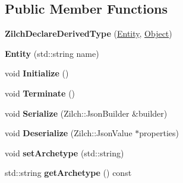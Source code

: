 \subsection*{Public Member Functions}
\begin{DoxyCompactItemize}
\item 
\hypertarget{classDCEngine_1_1Entity_a694fa17c410e8a544c387774c1ee439d}{{\bfseries Zilch\-Declare\-Derived\-Type} (\hyperlink{classDCEngine_1_1Entity}{Entity}, \hyperlink{classDCEngine_1_1Object}{Object})}\label{classDCEngine_1_1Entity_a694fa17c410e8a544c387774c1ee439d}

\item 
\hypertarget{classDCEngine_1_1Entity_a82afa978d172a7a1d3563697dc3688fe}{{\bfseries Entity} (std\-::string name)}\label{classDCEngine_1_1Entity_a82afa978d172a7a1d3563697dc3688fe}

\item 
\hypertarget{classDCEngine_1_1Entity_adfe6c0677a8f71c91caeddd87c8b5994}{void {\bfseries Initialize} ()}\label{classDCEngine_1_1Entity_adfe6c0677a8f71c91caeddd87c8b5994}

\item 
\hypertarget{classDCEngine_1_1Entity_ae1b42ae4dcfd7ffa712925d5594504af}{void {\bfseries Terminate} ()}\label{classDCEngine_1_1Entity_ae1b42ae4dcfd7ffa712925d5594504af}

\item 
\hypertarget{classDCEngine_1_1Entity_ad5b6558ae33d3f7ec2a89d8c84a37512}{void {\bfseries Serialize} (Zilch\-::\-Json\-Builder \&builder)}\label{classDCEngine_1_1Entity_ad5b6558ae33d3f7ec2a89d8c84a37512}

\item 
\hypertarget{classDCEngine_1_1Entity_acecb90a5603641e76ad14c852b539133}{void {\bfseries Deserialize} (Zilch\-::\-Json\-Value $\ast$properties)}\label{classDCEngine_1_1Entity_acecb90a5603641e76ad14c852b539133}

\item 
\hypertarget{classDCEngine_1_1Entity_a8828d9d483e7fc7d91b1a4c0da46a720}{void {\bfseries set\-Archetype} (std\-::string)}\label{classDCEngine_1_1Entity_a8828d9d483e7fc7d91b1a4c0da46a720}

\item 
\hypertarget{classDCEngine_1_1Entity_a443a66a28ab9e1b925cbfd6c850ff11f}{std\-::string {\bfseries get\-Archetype} () const }\label{classDCEngine_1_1Entity_a443a66a28ab9e1b925cbfd6c850ff11f}


\end{DoxyCompactItemize}
